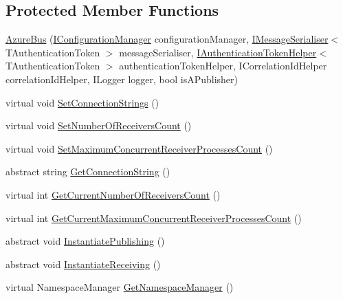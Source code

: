\subsection*{Protected Member Functions}
\begin{DoxyCompactItemize}
\item 
\hyperlink{classCqrs_1_1Azure_1_1ServiceBus_1_1AzureBus_a1046ff74282fd178f43e28420433d2a9}{Azure\+Bus} (\hyperlink{interfaceCqrs_1_1Configuration_1_1IConfigurationManager}{I\+Configuration\+Manager} configuration\+Manager, \hyperlink{interfaceCqrs_1_1Azure_1_1ServiceBus_1_1IMessageSerialiser}{I\+Message\+Serialiser}$<$ T\+Authentication\+Token $>$ message\+Serialiser, \hyperlink{interfaceCqrs_1_1Authentication_1_1IAuthenticationTokenHelper}{I\+Authentication\+Token\+Helper}$<$ T\+Authentication\+Token $>$ authentication\+Token\+Helper, I\+Correlation\+Id\+Helper correlation\+Id\+Helper, I\+Logger logger, bool is\+A\+Publisher)
\item 
virtual void \hyperlink{classCqrs_1_1Azure_1_1ServiceBus_1_1AzureBus_a8a1be9145b0a92c0037ef1b8b4cc79d9}{Set\+Connection\+Strings} ()
\item 
virtual void \hyperlink{classCqrs_1_1Azure_1_1ServiceBus_1_1AzureBus_a7633f211059ee45dfb907b16a955a790}{Set\+Number\+Of\+Receivers\+Count} ()
\item 
virtual void \hyperlink{classCqrs_1_1Azure_1_1ServiceBus_1_1AzureBus_a60cbe46aa3e60528dbd7e07be5132132}{Set\+Maximum\+Concurrent\+Receiver\+Processes\+Count} ()
\item 
abstract string \hyperlink{classCqrs_1_1Azure_1_1ServiceBus_1_1AzureBus_a514e371d5ce093678365af31e6c274e3}{Get\+Connection\+String} ()
\item 
virtual int \hyperlink{classCqrs_1_1Azure_1_1ServiceBus_1_1AzureBus_a8489f49aa20b972411e12465baa1bd14}{Get\+Current\+Number\+Of\+Receivers\+Count} ()
\item 
virtual int \hyperlink{classCqrs_1_1Azure_1_1ServiceBus_1_1AzureBus_adfed2926ff68eff521e8c64c02cca2a6}{Get\+Current\+Maximum\+Concurrent\+Receiver\+Processes\+Count} ()
\item 
abstract void \hyperlink{classCqrs_1_1Azure_1_1ServiceBus_1_1AzureBus_a0bacaa4619921333da4a27371c1d6d0a}{Instantiate\+Publishing} ()
\item 
abstract void \hyperlink{classCqrs_1_1Azure_1_1ServiceBus_1_1AzureBus_ac9f66dd531dcde49be72ba8f2cb28e9b}{Instantiate\+Receiving} ()
\item 
virtual Namespace\+Manager \hyperlink{classCqrs_1_1Azure_1_1ServiceBus_1_1AzureBus_ae7e6f920864cceec2850be9baac84803}{Get\+Namespace\+Manager} ()

\end{DoxyCompactItemize}
